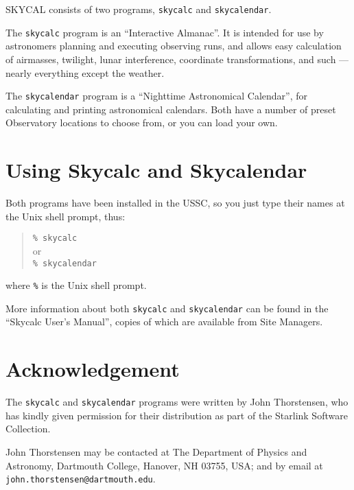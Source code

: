 SKYCAL consists of two programs, {\tt skycalc} and {\tt skycalendar}. 

The {\tt skycalc} program is an ``Interactive Almanac''. It is intended
for use by astronomers planning and executing observing runs, and
allows easy calculation of airmasses, twilight, lunar interference,
coordinate transformations, and such --- nearly everything except the
weather.

The {\tt skycalendar} program is a ``Nighttime Astronomical Calendar'',
for calculating and printing astronomical calendars.  Both have a
number of preset Observatory locations to choose from, or you can load
your own.

\section{Using Skycalc and Skycalendar}

Both programs have been installed in the USSC, so you just type their
names at the Unix shell prompt, thus:

\begin{quote}
{\tt \% skycalc} \\
or \\
{\tt \% skycalendar}
\end{quote}

where {\tt \%} is the Unix shell prompt.

More information about both {\tt skycalc} and {\tt skycalendar} can be
found in the ``{\sc Skycalc User's Manual}'', copies of which are
available from Site Managers.

\section{Acknowledgement}

The {\tt skycalc} and {\tt skycalendar} programs were written by John 
Thorstensen, who has kindly given permission for their distribution as part
of the Starlink Software Collection.  

John Thorstensen may be contacted at The Department of Physics and
Astronomy, Dartmouth College, Hanover, NH 03755, USA; and by email at
{\tt john.thorstensen@dartmouth.edu}.



